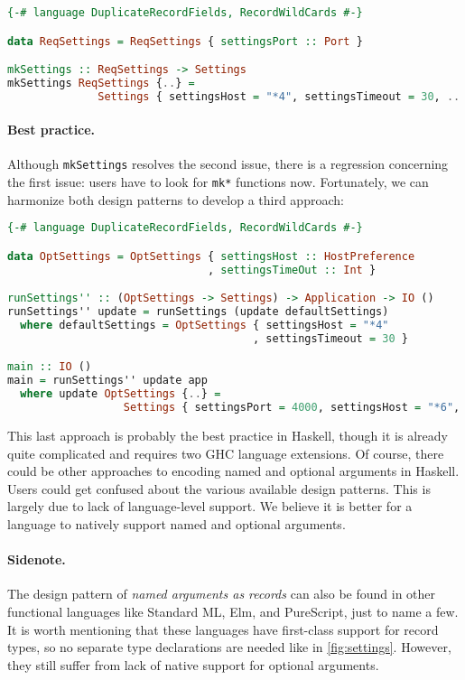 \begin{lstlisting}[language=Haskell]
{-# language DuplicateRecordFields, RecordWildCards #-}

data ReqSettings = ReqSettings { settingsPort :: Port }

mkSettings :: ReqSettings -> Settings
mkSettings ReqSettings {..} =
              Settings { settingsHost = "*4", settingsTimeout = 30, .. }
\end{lstlisting}

\paragraph{Best practice.}
Although \lstinline{mkSettings} resolves the second issue, there is a regression
concerning the first issue: users have to look for \lstinline{mk*} functions
now. Fortunately, we can harmonize both design patterns to develop a third
approach:

\begin{lstlisting}[language=Haskell]
{-# language DuplicateRecordFields, RecordWildCards #-}

data OptSettings = OptSettings { settingsHost :: HostPreference
                               , settingsTimeOut :: Int }

runSettings'' :: (OptSettings -> Settings) -> Application -> IO ()
runSettings'' update = runSettings (update defaultSettings)
  where defaultSettings = OptSettings { settingsHost = "*4"
                                      , settingsTimeout = 30 }

main :: IO ()
main = runSettings'' update app
  where update OptSettings {..} =
                  Settings { settingsPort = 4000, settingsHost = "*6", .. }
\end{lstlisting}

\noindent This last approach is probably the best practice in Haskell, though it
is already quite complicated and requires two GHC language extensions. Of
course, there could be other approaches to encoding named and optional arguments
in Haskell. Users could get confused about the various available design
patterns. This is largely due to lack of language-level support. We believe it
is better for a language to natively support named and optional arguments.

\paragraph{Sidenote.}
The design pattern of \emph{named arguments as records} can also be found in
other functional languages like Standard ML, Elm, and PureScript, just to name a
few. It is worth mentioning that these languages have first-class support for
record types, so no separate type declarations are needed like in
\autoref{fig:settings}. However, they still suffer from lack of native support
for optional arguments.


